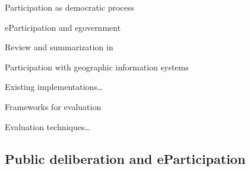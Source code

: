 Participation as democratic process 


eParticipation and egovernment  \cite{Jaeger2005_deliberate_democracy_and_egovernment} \cite{Macintosh2004_eParticipation_characterization}

Review and summarization in \cite{Saebo_eParticipation,Medaglia2012_eParticipation}


Participation with geographic information systems \cite{zhao2006geodf} \cite{Tang2005_PPGIS_discussion_forum} \cite{Rinner_ArgumentationMaps} \cite{Schlossberg2005_PPGIS} \cite{densham_sdss} \cite{Jankowski2005_community_based_pgis} \cite{Longueville2010_community_based_geoportals_web20} \cite{Rinner2009_Web2_argumap} \cite{sidlar_argumap_2007} \cite{Simao2009Webbased} \cite{Voss2004_Evolution_PGIS} \cite{Blaschke2004_PGIS_critically_revised} \cite{Sieber2006_PublicParticipationGIS}


Existing implementations\dots \cite{Rinner2007_geovis_decisionsupport} \cite{Boroushaki2010_ParticipatoryGIS} \cite{Kessler2005_ArgumentationMapPrototype} \cite{Kessler2005_Conflict_Resolution} \cite{Meng2010_ArgooMap_evaluation} \cite{Meng2010_WebPPGIS_Usability} \cite{Sani2011_Scalable_Argumap}


Frameworks for evaluation \cite{Walker2013Qualitative}

Evaluation techniques\dots 


\subsection{Public deliberation and eParticipation}

